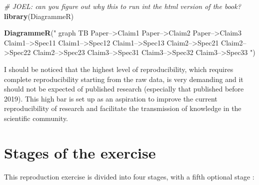 \documentclass[]{book}
\newenvironment{Shaded}{\begin{snugshade}}{\end{snugshade}}
\newcommand{\CommentTok}[1]{\textcolor[rgb]{0.56,0.35,0.01}{\textit{#1}}}
\newcommand{\KeywordTok}[1]{\textcolor[rgb]{0.13,0.29,0.53}{\textbf{#1}}}
\newcommand{\NormalTok}[1]{#1}
\newcommand{\StringTok}[1]{\textcolor[rgb]{0.31,0.60,0.02}{#1}}
\begin{document}
\begin{Shaded}
\begin{Highlighting}[]
\CommentTok{# JOEL: can you figure out why this to run int the html version of the book?}
\KeywordTok{library}\NormalTok{(DiagrammeR)}

\KeywordTok{DiagrammeR}\NormalTok{(}\StringTok{"}
\StringTok{   graph TB}
\StringTok{   Paper-->Claim1}
\StringTok{   Paper-->Claim2}
\StringTok{   Paper-->Claim3}
\StringTok{   Claim1-->Spec11}
\StringTok{   Claim1-->Spec12}
\StringTok{   Claim1-->Spec13}
\StringTok{   Claim2-->Spec21}
\StringTok{   Claim2-->Spec22}
\StringTok{   Claim2-->Spec23}
\StringTok{   Claim3-->Spec31}
\StringTok{   Claim3-->Spec32}
\StringTok{   Claim3-->Spec33}
\StringTok{   "}\NormalTok{)}
\end{Highlighting}
\end{Shaded}

I should be noticed that the highest level of reproducibility, which requires complete reproducibility starting from the raw data, is very demanding and it should not be expected of published research (especially that published before 2019). This high bar is set up as an aspiration to improve the current reproducibility of research and facilitate the transmission of knowledge in the scientific community.

\hypertarget{stages-of-the-exercise}{%
\section{Stages of the exercise}\label{stages-of-the-exercise}}

This reproduction exercise is divided into four stages, with a fifth optional stage :
\end{document}
